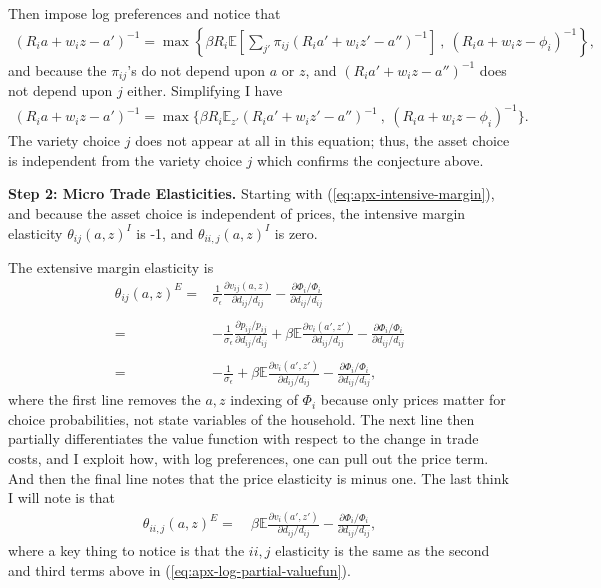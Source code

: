 \documentclass[12pt,pdftex]{article}
\begin{document}
\begin{onehalfspacing}
Then impose log preferences and notice that
\begin{align}
(R_{i}a + w_{i}z - a')^{-1} = \max \left\{ \beta R_{i} \mathbb{E} \left[ \sum_{j'} \pi_{ij} (R_{i}a' + w_{i}z' - a'')^{-1} \right] \ , \   (R_{i} a + w_{i}z - \phi_{i})^{-1} \right \},
\end{align}
and because the $\pi_{ij}$'s do not depend upon $a$ or $z$, and $(R_{i}a' + w_{i}z - a'')^{-1}$ does not depend upon $j$ either. Simplifying I have
\begin{align}
(R_{i}a + w_{i}z - a')^{-1} = \max \bigg \{ \beta R_{i} \mathbb{E}_{z'} (R_{i}a' + w_{i}z' - a'')^{-1}  \ , \   (R_{i} a + w_{i}z - \phi_{i})^{-1}  \bigg \}.
\end{align}
The variety choice $j$ does not appear at all in this equation; thus, the asset choice is independent from the variety choice $j$ which confirms the conjecture above. 

\textbf{Step 2: Micro Trade Elasticities.} Starting with (\ref{eq:apx-intensive-margin}), and because the asset choice is independent of prices, the intensive margin elasticity $\theta_{ij}(a,z)^I$ is -1, and $\theta_{ii,j}(a,z)^I$ is zero.

The extensive margin elasticity is
\begin{align}
\theta_{ij}(a,z)^E =& \frac{1}{\sigma_{\epsilon}}\frac{\partial v_{ij}(a,z)}{\partial d_{ij}/d_{ij}} -  \frac{\partial \Phi_{i} / \Phi_{i}}{\partial d_{ij}/d_{ij}}\\
\nonumber \\
=& -\frac{1}{\sigma_{\epsilon}}\frac{\partial p_{ij} / p_{ij}}{\partial d_{ij}/d_{ij}} + \beta \mathbb{E} \frac{\partial v_{i}(a',z')}{\partial d_{ij}/d_{ij}} -  \frac{\partial \Phi_{i} / \Phi_{i}}{\partial d_{ij}/d_{ij}} \\
\nonumber \\
=& -\frac{1}{\sigma_{\epsilon}} + \beta \mathbb{E} \frac{\partial v_{i}(a',z')}{\partial d_{ij}/d_{ij}} -  \frac{\partial \Phi_{i} / \Phi_{i}}{\partial d_{ij}/d_{ij}},
\label{eq:apx-log-partial-valuefun}
\end{align}
where the first line removes the $a,z$ indexing of $\Phi_i$ because only prices matter for choice probabilities, not state variables of the household. The next line then partially differentiates the value function with respect to the change in trade costs, and I exploit how, with log preferences, one can pull out the price term. And then the final line notes that the price elasticity is minus one. The last think I will note is that
\begin{align}
\theta_{ii,j}(a,z)^E =& \ \beta \mathbb{E} \frac{\partial v_{i}(a',z')}{\partial d_{ij}/d_{ij}} -  \frac{\partial \Phi_{i} / \Phi_{i}}{\partial d_{ij}/d_{ij}},
\end{align}
where a key thing to notice is that the $ii,j$ elasticity is the same as the second and third terms above in (\ref{eq:apx-log-partial-valuefun}).



\end{onehalfspacing}
\end{document}
